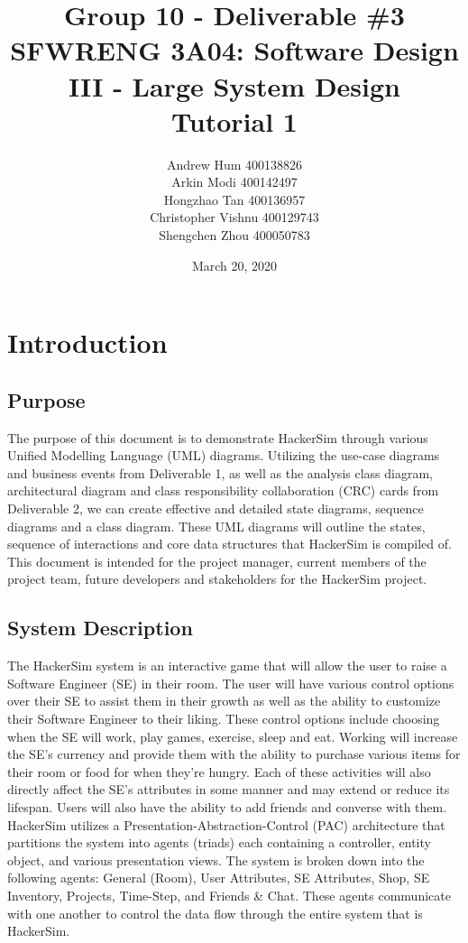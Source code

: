 \documentclass[]{article}
\title{
    \textbf{Group 10 - Deliverable \#3}\\
    \large SFWRENG 3A04: Software Design III - Large System Design\\
    \large Tutorial 1
}
\author{
    Andrew Hum 400138826\\
    Arkin Modi 400142497\\
    Hongzhao Tan 400136957\\
    Christopher Vishnu 400129743\\
    Shengchen Zhou 400050783\\
}
\date{March 20, 2020}
\begin{document}
\maketitle
\newpage

\section{Introduction}
\label{sec:introduction}


\subsection{Purpose}
\label{sub:purpose}
The purpose of this document is to demonstrate HackerSim through various 
Unified Modelling Language (UML) diagrams. Utilizing the use-case diagrams and 
business events from Deliverable 1, as well as the analysis class diagram, 
architectural diagram and class responsibility collaboration (CRC) cards from 
Deliverable 2, we can create effective and detailed state diagrams, sequence 
diagrams and a class diagram. These UML diagrams will outline the states, 
sequence of interactions and core data structures that HackerSim is compiled 
of. This document is intended for the project manager, current members of the 
project team, future developers and stakeholders for the HackerSim project.

\subsection{System Description}
\label{sub:system_description}
The HackerSim system is an interactive game that will allow the user to raise a
Software Engineer (SE) in their room. The user will have various control 
options over their SE to assist them in their growth as well as the ability to 
customize their Software Engineer to their liking. These control options 
include choosing when the SE will work, play games, exercise, sleep and eat. 
Working will increase the SE’s currency and provide them with the ability to 
purchase various items for their room or food for when they’re hungry. Each of 
these activities will also directly affect the SE’s attributes in some manner 
and may extend or reduce its lifespan. Users will also have the ability to add 
friends and converse with them.\\

\noindent HackerSim utilizes a Presentation-Abstraction-Control (PAC) 
architecture that partitions the system into agents (triads) each containing a 
controller, entity object, and various presentation views. The system is broken
down into the following agents: General (Room), User Attributes, SE Attributes,
Shop, SE Inventory, Projects, Time-Step, and Friends \& Chat. These agents 
communicate with one another to control the data flow through the entire system
that is HackerSim.
\end{document}
